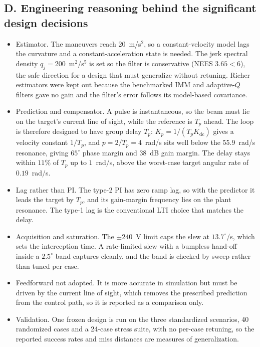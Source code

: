 \documentclass[conference]{IEEEtran}
\begin{document}
\subsection*{D. Engineering reasoning behind the significant design decisions}
\begin{itemize}\itemsep0pt
\item Estimator. The maneuvers reach $20$~m/s$^2$, so a constant-velocity model lags the curvature and a constant-acceleration state is needed. The jerk spectral density $q_j=200$~m$^2$/s$^5$ is set so the filter is conservative (NEES $3.65<6$), the safe direction for a design that must generalize without retuning. Richer estimators were kept out because the benchmarked IMM and adaptive-$Q$ filters gave no gain and the filter's error follows its model-based covariance.
\item Prediction and compensator. A pulse is instantaneous, so the beam must lie on the target's current line of sight, while the reference is $T_p$ ahead. The loop is therefore designed to have group delay $T_p$: $K_p=1/(T_pK_{\mathrm{dc}})$ gives a velocity constant $1/T_p$, and $p=2/T_p=4$~rad/s sits well below the $55.9$~rad/s resonance, giving $65^\circ$ phase margin and $38$~dB gain margin. The delay stays within $11\%$ of $T_p$ up to $1$~rad/s, above the worst-case target angular rate of $0.19$~rad/s.
\item Lag rather than PI. The type-2 PI has zero ramp lag, so with the predictor it leads the target by $T_p$, and its gain-margin frequency lies on the plant resonance. The type-1 lag is the conventional LTI choice that matches the delay.
\item Acquisition and saturation. The $\pm240$~V limit caps the slew at $13.7^\circ$/s, which sets the interception time. A rate-limited slew with a bumpless hand-off inside a $2.5^\circ$ band captures cleanly, and the band is checked by sweep rather than tuned per case.
\item Feedforward not adopted. It is more accurate in simulation but must be driven by the current line of sight, which removes the prescribed prediction from the control path, so it is reported as a comparison only.
\item Validation. One frozen design is run on the three standardized scenarios, 40 randomized cases and a 24-case stress suite, with no per-case retuning, so the reported success rates and miss distances are measures of generalization.
\end{itemize}
\end{document}
